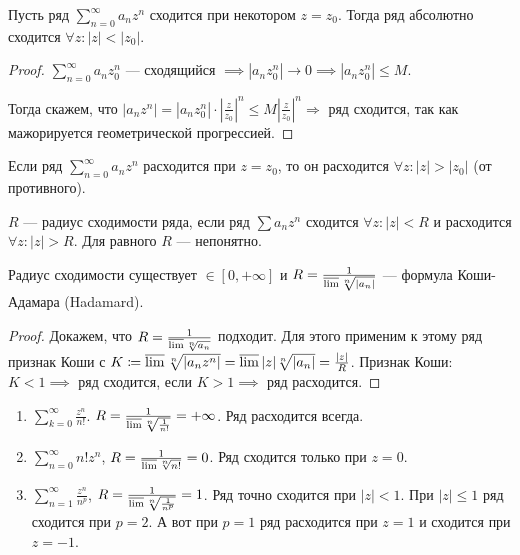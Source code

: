 \begin{theorem}
    Пусть ряд $\sum\limits_{n=0}^\infty a_nz^n$ сходится при некотором  $z = z_0$. Тогда ряд абсолютно сходится  $\forall z\!: |z| < |z_0|$.
\end{theorem}
\begin{proof}
    $\sum\limits_{n=0}^\infty a_n z_0^n$ --- сходящийся $\implies |a_nz_0^n| \to 0 \implies |a_nz_0^n| \le M$.

    Тогда скажем, что $|a_nz^n| = |a_nz_0^n| \cdot \left|\frac{z}{z_0}\right|^n \le M \left|\frac{z}{z_0}\right|^n \Rightarrow$ ряд сходится, так как мажорируется геометрической прогрессией.
\end{proof}
\begin{consequence}
    Если ряд $\sum\limits_{n=0}^\infty a_nz^n$ расходится при  $z=z_0$, то он расходится  $\forall z\!: |z| > |z_0|$ (от противного).
\end{consequence}
\begin{definition}
    $R$ --- радиус сходимости ряда, если ряд  $\sum a_nz^n$  сходится $\forall z\!: |z| < R$ и расходится  $\forall z\!: |z| > R$. Для равного $R$ --- непонятно.
\end{definition}
\begin{theorem}
    Радиус сходимости существует $\in [0, +\infty]$ и  $R = \frac{1}{\varlimsup \sqrt[n]{|a_n|}}$ --- формула Коши-Адамара (Hadamard).
\end{theorem}
\begin{proof}
    Докажем, что $R = \frac{1}{\varlimsup \sqrt[n]{a_n}}$ подходит. Для этого применим к этому ряд признак Коши с $K \coloneqq \varlimsup \sqrt[n]{|a_nz^n|} = \varlimsup |z| \sqrt[n]{|a_n|} = \frac{|z|}{R}$. Признак Коши: $K < 1 \implies$ ряд сходится, если  $K > 1 \implies$ ряд расходится.
\end{proof}
\begin{example}
    \begin{enumerate}
        \item $\sum\limits_{k=0}^\infty \frac{z^n}{n!}$. $R = \frac{1}{\varlimsup \sqrt[n]{\frac{1}{n!}}} = +\infty$. Ряд расходится всегда.
        \item $\sum\limits_{n=0}^\infty n!z^n$,  $R = \frac{1}{\varlimsup \sqrt[n]{n!}} = 0$. Ряд сходится только при $z = 0$.
        \item  $\sum\limits_{n=1}^\infty \frac{z^n}{n^p}$, $R = \frac{1}{\varlimsup \sqrt[n]{\frac{1}{n^p}}} = 1$. Ряд точно сходится при $|z| < 1$. При  $|z| \le 1$ ряд сходится при $p = 2$. А вот при $p=1$ ряд расходится при  $z=1$ и сходится при  $z = -1$.
    \end{enumerate}
\end{example}
